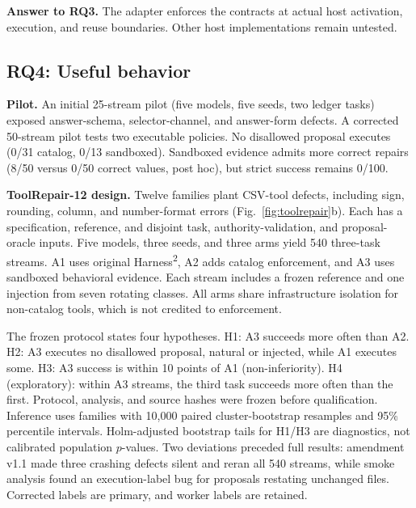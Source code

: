 \documentclass[letterpaper,journal]{IEEEtran}
\newcommand{\harness}{Harness\textsuperscript{2}}
\begin{document}
\textbf{Answer to RQ3.} The adapter enforces the contracts at actual host activation, execution, and reuse boundaries. Other host implementations remain untested.

\subsection{RQ4: Useful behavior}\label{sec:rq4}
\textbf{Pilot.} An initial 25-stream pilot (five models, five seeds, two ledger tasks) exposed answer-schema, selector-channel, and answer-form defects. A corrected 50-stream pilot tests two executable policies. No disallowed proposal executes (0/31 catalog, 0/13 sandboxed). Sandboxed evidence admits more correct repairs (8/50 versus 0/50 correct values, post hoc), but strict success remains 0/100.

\textbf{ToolRepair-12 design.} Twelve families plant CSV-tool defects, including sign, rounding, column, and number-format errors (Fig.~\ref{fig:toolrepair}b). Each has a specification, reference, and disjoint task, authority-validation, and proposal-oracle inputs. Five models, three seeds, and three arms yield 540 three-task streams. A1 uses original \harness{}, A2 adds catalog enforcement, and A3 uses sandboxed behavioral evidence. Each stream includes a frozen reference and one injection from seven rotating classes. All arms share infrastructure isolation for non-catalog tools, which is not credited to enforcement.

The frozen protocol states four hypotheses. H1: A3 succeeds more often than A2. H2: A3 executes no disallowed proposal, natural or injected, while A1 executes some. H3: A3 success is within 10 points of A1 (non-inferiority). H4 (exploratory): within A3 streams, the third task succeeds more often than the first. Protocol, analysis, and source hashes were frozen before qualification. Inference uses families with 10,000 paired cluster-bootstrap resamples and 95\% percentile intervals. Holm-adjusted bootstrap tails for H1/H3 are diagnostics, not calibrated population $p$-values. Two deviations preceded full results: amendment v1.1 made three crashing defects silent and reran all 540 streams, while smoke analysis found an execution-label bug for proposals restating unchanged files. Corrected labels are primary, and worker labels are retained.
\end{document}
